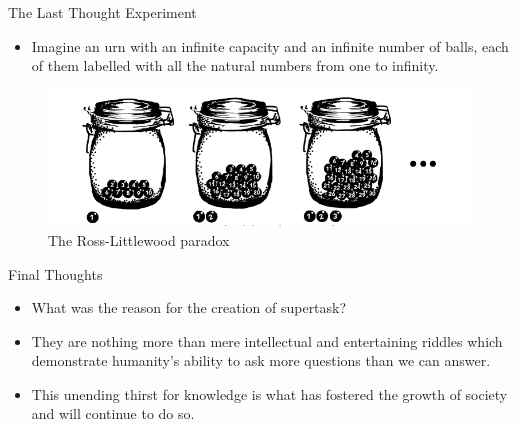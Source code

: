 \documentclass{beamer}
\begin{document}
\begin{frame}{The Last Thought Experiment}
    \begin{itemize}
        \item Imagine an urn with an infinite capacity and an infinite number of balls, each of them labelled with all the natural numbers from one to infinity.
    \end{itemize}
    
    \begin{figure}
        \centering
        \includegraphics[width=\textwidth]{last.PNG}
        \caption{The Ross-Littlewood paradox}
        \label{fig:my_label}
    \end{figure}
\end{frame}

\begin{frame}{Final Thoughts}
    \begin{itemize}
        \item What was the reason for the creation of supertask?
        \item They are nothing more than mere intellectual and entertaining riddles which demonstrate humanity's ability to ask more questions than we can answer.
        \item This unending thirst for knowledge is what has fostered the growth of society and will continue to do so.
    \end{itemize}
\end{frame}

\end{document}
